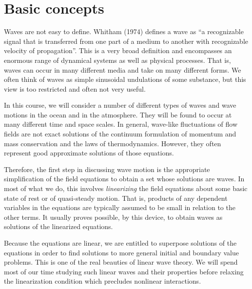 
\setcounter{chapter}{0}

\chapter{Basic concepts}

Waves are not easy to define. Whitham (1974) defines a wave as ``a recognizable signal
that is transferred from one part of a medium to another with recognizable velocity of
propagation''. This is a very broad definition and encompasses an enormous range of
dynamical systems as well as physical processes. That is, waves can occur in many
different media and take on many different forms. We often think of waves as simple
sinusoidal undulations of some substance, but this view is too restricted and often not
very useful.

In this course, we will consider a number of different types of waves and wave motions
in the ocean and in the atmosphere. They will be found to occur at many different time
and space scales. In general, wave-like fluctuations of flow fields are not exact
solutions of the continuum formulation of momentum and mass conservation and the laws
of thermodynamics. However, they often represent good approximate solutions of those
equations.

\sourcepagebreak

Therefore, the first step in discussing wave motion is the appropriate simplification of
the field equations to obtain a set whose solutions are waves. In most of what we do,
this involves \emph{linearizing} the field equations about some basic state of rest or of
quasi-steady motion. That is, products of any dependent variables in the equations are
typically assumed to be small in relation to the other terms. It usually proves possible,
by this device, to obtain waves as solutions of the linearized equations.

Because the equations are linear, we are entitled to superpose solutions of the equations
in order to find solutions to more general initial and boundary value problems. This is
one of the real beauties of linear wave theory. We will spend most of our time studying
such linear waves and their properties before relaxing the linearization condition which
precludes nonlinear interactions.

